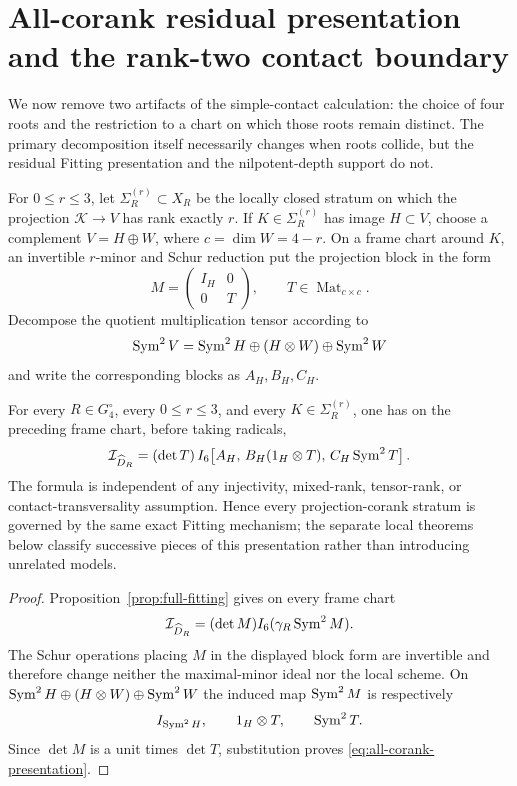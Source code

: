 \section{All-corank residual presentation and the rank-two contact boundary}
\label{sec:ranktwo-boundary}

We now remove two artifacts of the simple-contact calculation:
the choice of four roots and the restriction to a chart on which those
roots remain distinct.  The primary decomposition itself necessarily
changes when roots collide, but the residual Fitting presentation and
the nilpotent-depth support do not.

For $0\le r\le3$, let $\Sigma_R^{(r)}\subset X_R$ be the
locally closed stratum on which the projection $\mathcal K\to V$ has
rank exactly $r$.  If $K\in\Sigma_R^{(r)}$ has image $H\subset V$,
choose a complement $V=H\oplus W$, where $c=\dim W=4-r$.  On a frame
chart around $K$, an invertible $r$-minor and Schur reduction put the
projection block in the form
\[
 M=\begin{pmatrix}I_H&0\\0&T\end{pmatrix},
 \qquad T\in\operatorname{Mat}_{c\times c}.
\]
Decompose the quotient multiplication tensor according to
\[
 \operatorname{Sym}^2V=\operatorname{Sym}^2H\oplus(H\otimes W)\oplus\operatorname{Sym}^2W
\]
and write the corresponding blocks as $A_H,B_H,C_H$.

\begin{theorem}
\label{thm:all-corank-presentation}
For every $R\in G_4^\circ$, every $0\le r\le3$, and every
$K\in\Sigma_R^{(r)}$, one has on the preceding frame chart, before
taking radicals,
\begin{equation}\label{eq:all-corank-presentation}
 \mathcal I_{\widehat D_R}
 =
 (\det T)\,
 I_6\!\left[
 A_H,\,
 B_H(1_H\otimes T),\,
 C_H\operatorname{Sym}^2T
 \right].
\end{equation}
The formula is independent of any injectivity, mixed-rank,
tensor-rank, or contact-transversality assumption.  Hence every
projection-corank stratum is governed by the same exact Fitting
mechanism; the separate local theorems below classify successive
pieces of this presentation rather than introducing unrelated models.
\end{theorem}
\begin{proof}
Proposition~\ref{prop:full-fitting} gives on every frame chart
\[
 \mathcal I_{\widehat D_R}
 =(\det M)I_6(\gamma_R\operatorname{Sym}^2M).
\]
The Schur operations placing $M$ in the displayed block form are
invertible and therefore change neither the maximal-minor ideal nor
the local scheme.  On
$\operatorname{Sym}^2H\oplus(H\otimes W)\oplus\operatorname{Sym}^2W$ the induced map
$\operatorname{Sym}^2M$ is respectively
\[
 I_{\operatorname{Sym}^2H},\qquad 1_H\otimes T,\qquad\operatorname{Sym}^2T.
\]
Since $\det M$ is a unit times $\det T$, substitution proves
\eqref{eq:all-corank-presentation}.
\end{proof}

